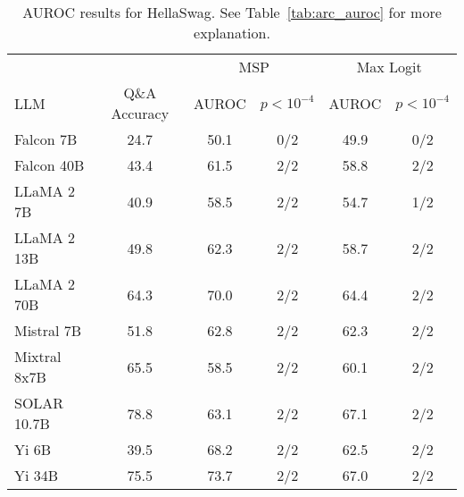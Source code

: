 \begin{table*}[!h]
\centering
\caption{AUROC results for HellaSwag. See Table~\ref{tab:arc_auroc} for more explanation.}
\label{tab:hellaswag_auroc}
\begin{tabular}{lccccc}
\toprule
& & \multicolumn{2}{c}{MSP} & \multicolumn{2}{c}{Max Logit} \\ 
LLM & Q\&A Accuracy & AUROC & $p < 10^{-4}$ & AUROC & $p < 10^{-4}$\\ 
\cmidrule(lr){1-1} \cmidrule(lr){2-2} \cmidrule(lr){3-4} \cmidrule(lr){5-6}
Falcon 7B & 24.7 & 50.1 & 0/2 & 49.9 & 0/2 \\
Falcon 40B & 43.4 & 61.5 & 2/2 & 58.8 & 2/2 \\
LLaMA 2 7B & 40.9 & 58.5 & 2/2 & 54.7 & 1/2 \\
LLaMA 2 13B & 49.8 & 62.3 & 2/2 & 58.7 & 2/2\\
LLaMA 2 70B & 64.3 & 70.0 & 2/2 & 64.4 & 2/2\\
Mistral 7B & 51.8 & 62.8 & 2/2 & 62.3 & 2/2\\
Mixtral 8x7B & 65.5 & 58.5 & 2/2 & 60.1 & 2/2\\
SOLAR 10.7B & 78.8 & 63.1 & 2/2 & 67.1 & 2/2\\
Yi 6B & 39.5 & 68.2 & 2/2 & 62.5 & 2/2\\
Yi 34B & 75.5 & 73.7 & 2/2 & 67.0 & 2/2\\
\bottomrule
\end{tabular}
\end{table*}


